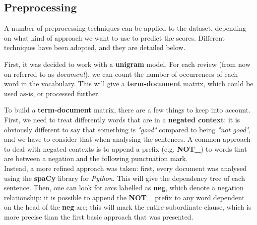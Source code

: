 \documentclass[
12pt,
a4paper,
oneside,
headinclude,
footinclude]{article}
\theoremstyle{definition} %
\begin{document}
\subsection{Preprocessing}
A number of preprocessing techniques can be applied to the dataset, depending on what kind of approach we want to use to predict the scores. Different techniques have been adopted, and they are detailed below.

First, it was decided to work with a \textbf{unigram} model. For each review (from now on referred to as \textit{document}), we can count the number of occurrences of each word in the vocabulary. This will give a \textbf{term-document} matrix, which could be used as-is, or processed further.

To build a \textbf{term-document} matrix, there are a few things to keep into account.\\
First, we need to treat differently words that are in a \textbf{negated context}: it is obviously different to say that something is \textit{"good"} compared to being \textit{"not good"}, and we have to consider that when analysing the sentences. A common approach to deal with negated contexts is to append a prefix (e.g. \textbf{NOT\_}) to words that are between a negation and the following punctuation mark.\\
Instead, a more refined approach was taken: first, every document was analysed using the \textbf{spaCy} library for \textit{Python}. This will give the dependency tree of each sentence. Then, one can look for arcs labelled as \textbf{neg}, which denote a negation relationship: it is possible to append the \textbf{NOT\_} prefix to any word dependent on the head of the \textbf{neg} arc; this will mark the entire subordinate clause, which is more precise than the first basic approach that was presented. 




\end{document}
